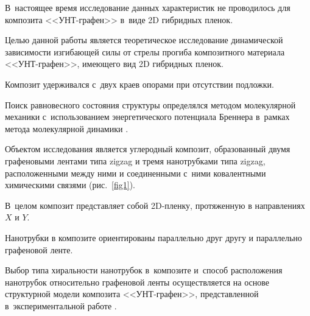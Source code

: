 В~настоящее время исследование данных характеристик не проводилось для композита <<УНТ-графен>> в~виде 2D гибридных пленок.



Целью данной работы является теоретическое исследование динамической зависимости изгибающей силы от стрелы прогиба композитного материала <<УНТ-графен>>, имеющего вид 2D гибридных пленок. 

Композит удерживался с~двух краев опорами при отсутствии подложки. 

Поиск равновесного состояния структуры определялся методом молекулярной механики с~использованием энергетического потенциала Бреннера \cite{kol:bib13} в~рамках метода молекулярной динамики \cite{kol:bib14,kol:bib15,kol:bib16}.



\smallskip




Объектом исследования является углеродный композит, образованный двумя графеновыми лентами типа zigzag и тремя нанотрубками типа zigzag, расположенными между ними и соединенными с~ними ковалентными химическими связями (рис.~\ref{fig1}). 

В~целом композит представляет собой 2D-пленку, протяженную в направлениях $X$ и $Y$. 

Нанотрубки в композите ориентированы параллельно друг другу и параллельно графеновой ленте. 

Выбор типа хиральности нанотрубок в~композите и~способ расположения нанотрубок относительно графеновой ленты осуществляется на основе структурной модели композита <<УНТ-графен>>, представленной в~экспериментальной работе \cite{kol:bib7}.



